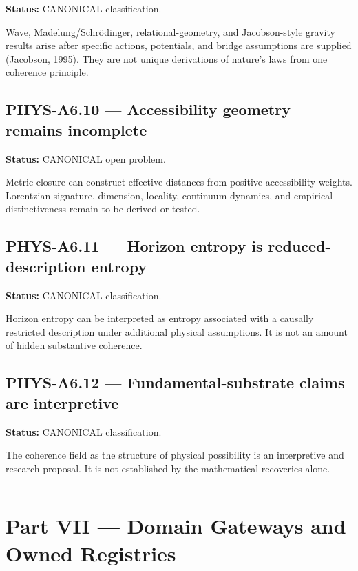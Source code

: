 \documentclass[
  11pt,
]{article}
\begin{document}
\textbf{Status:} CANONICAL classification.

Wave, Madelung/Schrödinger, relational-geometry, and Jacobson-style
gravity results arise after specific actions, potentials, and bridge
assumptions are supplied (Jacobson, 1995). They are not unique
derivations of nature's laws from one coherence principle.

\subsection{PHYS-A6.10 --- Accessibility geometry remains
incomplete}\label{phys-a6.10-accessibility-geometry-remains-incomplete}

\textbf{Status:} CANONICAL open problem.

Metric closure can construct effective distances from positive
accessibility weights. Lorentzian signature, dimension, locality,
continuum dynamics, and empirical distinctiveness remain to be derived
or tested.

\subsection{PHYS-A6.11 --- Horizon entropy is reduced-description
entropy}\label{phys-a6.11-horizon-entropy-is-reduced-description-entropy}

\textbf{Status:} CANONICAL classification.

Horizon entropy can be interpreted as entropy associated with a causally
restricted description under additional physical assumptions. It is not
an amount of hidden substantive coherence.

\subsection{PHYS-A6.12 --- Fundamental-substrate claims are
interpretive}\label{phys-a6.12-fundamental-substrate-claims-are-interpretive}

\textbf{Status:} CANONICAL classification.

The coherence field as the structure of physical possibility is an
interpretive and research proposal. It is not established by the
mathematical recoveries alone.

\begin{center}\rule{0.5\linewidth}{0.5pt}\end{center}

\section{Part VII --- Domain Gateways and Owned
Registries}\label{part-vii-domain-gateways-and-owned-registries}
\end{document}
